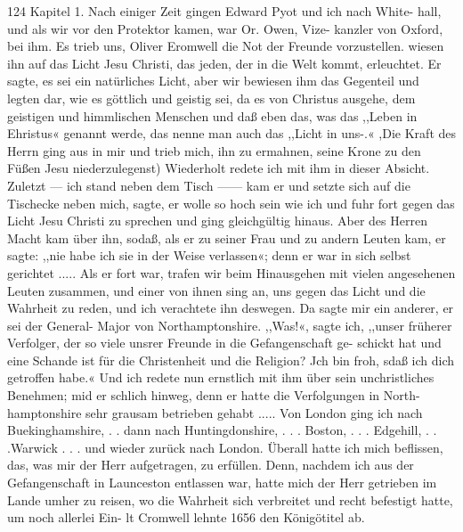 124 Kapitel 1.
Nach einiger Zeit gingen Edward Pyot und ich nach White-
hall, und als wir vor den Protektor kamen, war Or. Owen, Vize-
kanzler von Oxford, bei ihm. Es trieb uns, Oliver Eromwell die
Not der Freunde vorzustellen.   wiesen ihn auf das Licht
Jesu Christi, das jeden, der in die Welt kommt, erleuchtet.
Er sagte, es sei ein natürliches Licht, aber wir bewiesen ihm das
Gegenteil und legten dar, wie es göttlich und geistig sei, da es
von Christus ausgehe, dem geistigen und himmlischen Menschen
und daß eben das, was das ,,Leben in Ehristus« genannt werde,
das nenne man auch das ,,Licht in uns-.« ,Die Kraft des Herrn
ging aus in mir und trieb mich, ihn zu ermahnen, seine Krone
zu den Füßen Jesu niederzulegenst) Wiederholt redete ich mit
ihm in dieser Absicht. Zuletzt — ich stand neben dem Tisch ——
kam er und setzte sich auf die Tischecke neben mich, sagte, er wolle
so hoch sein wie ich und fuhr fort gegen das Licht Jesu Christi
zu sprechen und ging gleichgültig hinaus. Aber des Herren Macht
kam über ihn, sodaß, als er zu seiner Frau und zu andern
Leuten kam, er sagte: ,,nie habe ich sie in der Weise verlassen«;
denn er war in sich selbst gerichtet .....
Als er fort war, trafen wir beim Hinausgehen mit vielen
angesehenen Leuten zusammen, und einer von ihnen sing an, uns
gegen das Licht und die Wahrheit zu reden, und ich verachtete
ihn deswegen. Da sagte mir ein anderer, er sei der General-
Major von Northamptonshire. ,,Was!«, sagte ich, ,,unser früherer
Verfolger, der so viele unsrer Freunde in die Gefangenschaft ge-
schickt hat und eine Schande ist für die Christenheit und die
Religion? Jch bin froh, sdaß ich dich getroffen habe.« Und ich
redete nun ernstlich mit ihm über sein unchristliches Benehmen;
mid er schlich hinweg, denn er hatte die Verfolgungen in North-
hamptonshire sehr grausam betrieben gehabt .....
Von London ging ich nach Buekinghamshire, . . dann nach
Huntingdonshire, . . . Boston, . . . Edgehill, . . .Warwick . . .
und wieder zurück nach London. Überall hatte ich mich beflissen,
das, was mir der Herr aufgetragen, zu erfüllen. Denn, nachdem
ich aus der Gefangenschaft in Launceston entlassen war, hatte mich
der Herr getrieben im Lande umher zu reisen, wo die Wahrheit
sich verbreitet und recht befestigt hatte, um noch allerlei Ein-
lt Cromwell lehnte 1656 den Königötitel ab.


